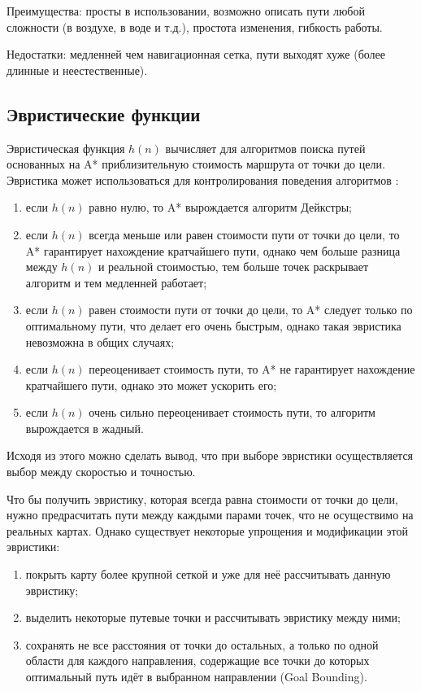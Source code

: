 Преимущества: просты в использовании, возможно описать пути любой сложности (в воздухе, в воде и т.д.), простота изменения, гибкость работы.

Недостатки: медленней чем навигационная сетка, пути выходят хуже (более длинные и неестественные).

\subsection{Эвристические функции}

Эвристическая функция $h(n)$ вычисляет для алгоритмов поиска путей основанных на A* приблизительную стоимость маршрута от точки до цели. Эвристика может использоваться для контролирования поведения алгоритмов \cite{HEURISTICS}:

\begin{enumerate}
	\item если $h(n)$ равно нулю, то A* вырождается алгоритм Дейкстры;
	\item если $h(n)$ всегда меньше или равен стоимости пути от точки до цели, то A* гарантирует нахождение кратчайшего пути, однако чем больше разница между $h(n)$ и реальной стоимостью, тем больше точек раскрывает алгоритм и тем медленней работает;
	\item если $h(n)$ равен стоимости пути от точки до цели, то A* следует только по оптимальному пути, что делает его очень быстрым, однако такая эвристика невозможна в общих случаях;
	\item если $h(n)$ переоценивает стоимость пути, то A* не гарантирует нахождение кратчайшего пути, однако это может ускорить его;
	\item если $h(n)$ очень сильно переоценивает стоимость пути, то алгоритм вырождается в жадный.
\end{enumerate}

Исходя из этого можно сделать вывод, что при выборе эвристики осуществляется выбор между скоростью и точностью.

Что бы получить эвристику, которая всегда равна стоимости от точки до цели, нужно предрасчитать пути между каждыми парами точек, что не осуществимо на реальных картах. Однако существует некоторые упрощения и модификации этой эвристики:

\begin{enumerate}
	\item покрыть карту более крупной сеткой и уже для неё рассчитывать данную эвристику;
	\item выделить некоторые путевые точки и рассчитывать эвристику между ними;
	\item сохранять не все расстояния от точки до остальных, а только по одной области для каждого направления, содержащие все точки до которых оптимальный путь идёт в выбранном направлении (Goal Bounding).
\end{enumerate}

